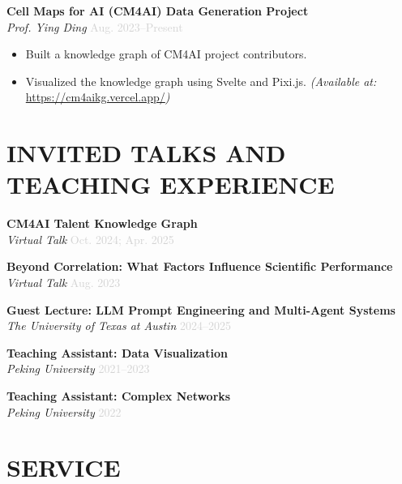 \documentclass[a4paper,9pt]{extarticle}
\newcommand{\role}[1]{\textbf{\color{darkgray}#1}}
\newcommand{\institution}[1]{\textit{#1}}
\newcommand{\daterange}[1]{\textcolor{lightgray}{#1}}
\begin{document}
 \vspace{0.6em}

\noindent
\role{Cell Maps for AI (CM4AI) Data Generation Project} \\
\institution{Prof. Ying Ding} \hfill \daterange{Aug. 2023--Present}
\begin{itemize}[leftmargin=1em]
\item Built a knowledge graph of CM4AI project contributors.
\item Visualized the knowledge graph using Svelte and Pixi.js. \textit{(Available at:} \url{https://cm4aikg.vercel.app/}\textit{)}
\end{itemize}
 \vspace{0.5em}


\section*{INVITED TALKS AND TEACHING EXPERIENCE}

\noindent \role{CM4AI Talent Knowledge Graph} \\
\institution{Virtual Talk} \hfill \daterange{Oct. 2024; Apr. 2025}

\vspace{0.3em}
\noindent \role{Beyond Correlation: What Factors Influence Scientific Performance} \\
\institution{Virtual Talk} \hfill \daterange{Aug. 2023}

\vspace{0.3em}
\noindent \role{Guest Lecture: LLM Prompt Engineering and Multi-Agent Systems} \\
\institution{The University of Texas at Austin} \hfill \daterange{2024--2025}

\vspace{0.3em}
\noindent \role{Teaching Assistant: Data Visualization} \\
\institution{Peking University} \hfill \daterange{2021--2023}

\vspace{0.3em}
\noindent \role{Teaching Assistant: Complex Networks} \\
\institution{Peking University} \hfill \daterange{2022}




\section*{SERVICE}
\end{document}
